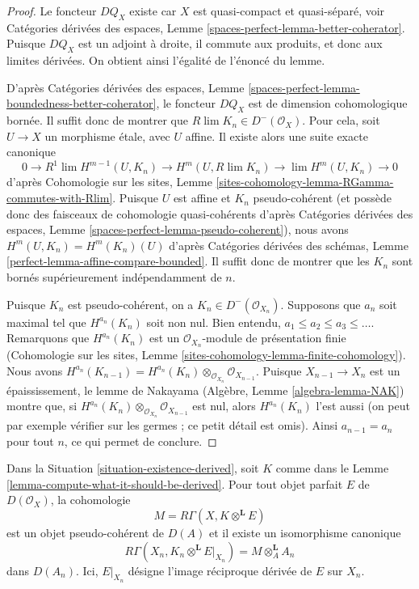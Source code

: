 \begin{proof}
Le foncteur $DQ_X$ existe car $X$ est quasi-compact et
quasi-séparé, voir Catégories dérivées des espaces, Lemme
\ref{spaces-perfect-lemma-better-coherator}.
Puisque $DQ_X$ est un adjoint à droite, il commute aux produits,
et donc aux limites dérivées. On obtient ainsi l'égalité
de l'énoncé du lemme.

\medskip\noindent
D'après Catégories dérivées des espaces,
Lemme \ref{spaces-perfect-lemma-boundedness-better-coherator},
le foncteur $DQ_X$ est de dimension cohomologique bornée.
Il suffit donc de montrer que $R\lim K_n \in D^-(\mathcal{O}_X)$.
Pour cela, soit $U \to X$ un morphisme \'etale, avec $U$ affine.
Il existe alors une suite exacte canonique
$$
0 \to
R^1\lim H^{m - 1}(U, K_n) \to H^m(U, R\lim K_n) \to
\lim H^m(U, K_n) \to 0
$$
d'après Cohomologie sur les sites, Lemme
\ref{sites-cohomology-lemma-RGamma-commutes-with-Rlim}.
Puisque $U$ est affine et $K_n$ pseudo-cohérent (et possède donc des
faisceaux de cohomologie quasi-cohérents d'après
Catégories dérivées des espaces, Lemme \ref{spaces-perfect-lemma-pseudo-coherent}),
nous avons $H^m(U, K_n) = H^m(K_n)(U)$ d'après
Catégories dérivées des schémas, Lemme \ref{perfect-lemma-affine-compare-bounded}.
Il suffit donc de montrer que les $K_n$ sont
bornés supérieurement indépendamment de $n$.

\medskip\noindent
Puisque $K_n$ est pseudo-cohérent, on a $K_n \in D^-(\mathcal{O}_{X_n})$.
Supposons que $a_n$ soit maximal tel que $H^{a_n}(K_n)$ soit non nul.
Bien entendu, $a_1 \leq a_2 \leq a_3 \leq \ldots$.
Remarquons que $H^{a_n}(K_n)$ est un
$\mathcal{O}_{X_n}$-module de présentation finie
(Cohomologie sur les sites, Lemme
\ref{sites-cohomology-lemma-finite-cohomology}).
Nous avons $H^{a_n}(K_{n - 1}) =
H^{a_n}(K_n) \otimes_{\mathcal{O}_{X_n}} \mathcal{O}_{X_{n - 1}}$.
Puisque $X_{n - 1} \to X_n$ est un épaississement, le
lemme de Nakayama (Algèbre, Lemme \ref{algebra-lemma-NAK}) montre que, si
$H^{a_n}(K_n) \otimes_{\mathcal{O}_{X_n}} \mathcal{O}_{X_{n - 1}}$
est nul, alors $H^{a_n}(K_n)$ l'est aussi (on peut par exemple vérifier
sur les germes ; ce petit détail est omis).
Ainsi $a_{n - 1} = a_n$ pour tout $n$, ce qui permet de conclure.
\end{proof}

\begin{lemma}
\label{lemma-compute-against-perfect-derived}
Dans la Situation \ref{situation-existence-derived}, soit $K$ comme dans le
Lemme \ref{lemma-compute-what-it-should-be-derived}. Pour tout objet parfait
$E$ de $D(\mathcal{O}_X)$, la cohomologie
$$
M = R\Gamma(X, K \otimes^\mathbf{L} E)
$$
est un objet pseudo-cohérent de $D(A)$ et il existe un isomorphisme canonique
$$
R\Gamma(X_n, K_n \otimes^\mathbf{L} E|_{X_n}) = M \otimes_A^\mathbf{L} A_n
$$
dans $D(A_n)$. Ici, $E|_{X_n}$ désigne l'image réciproque dérivée de $E$ sur $X_n$.
\end{lemma}

